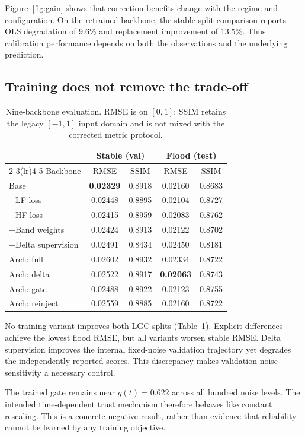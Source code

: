 \documentclass{article}
\begin{document}
Figure~\ref{fig:gain} shows that correction benefits change with the regime and configuration.
On the retrained backbone, the stable-split comparison reports OLS degradation of 9.6\% and replacement improvement of 13.5\%.
Thus calibration performance depends on both the observations and the underlying prediction.

\subsection{Training does not remove the trade-off}
\begin{table}[t]
\centering
\caption{Nine-backbone evaluation. RMSE is on $[0,1]$; SSIM retains the legacy $[-1,1]$ input domain and is not mixed with the corrected metric protocol.}
\label{tab:backbones}
\setlength{\tabcolsep}{2.5pt}
\begin{tabular}{lcccc}
\toprule
 & \multicolumn{2}{c}{Stable (val)} & \multicolumn{2}{c}{Flood (test)}\\
\cmidrule(lr){2-3}\cmidrule(lr){4-5}
Backbone & RMSE & SSIM & RMSE & SSIM\\
\midrule
Base & \textbf{0.02329} & 0.8918 & 0.02160 & 0.8683\\
+LF loss & 0.02448 & 0.8895 & 0.02104 & 0.8727\\
+HF loss & 0.02415 & 0.8959 & 0.02083 & 0.8762\\
+Band weights & 0.02424 & 0.8913 & 0.02122 & 0.8702\\
+Delta supervision & 0.02491 & 0.8434 & 0.02450 & 0.8181\\
Arch: full & 0.02602 & 0.8932 & 0.02334 & 0.8722\\
Arch: delta & 0.02522 & 0.8917 & \textbf{0.02063} & 0.8743\\
Arch: gate & 0.02488 & 0.8922 & 0.02123 & 0.8755\\
Arch: reinject & 0.02559 & 0.8885 & 0.02160 & 0.8722\\
\bottomrule
\end{tabular}
\end{table}

No training variant improves both LGC splits (Table~\ref{tab:backbones}).
Explicit differences achieve the lowest flood RMSE, but all variants worsen stable RMSE.
Delta supervision improves the internal fixed-noise validation trajectory yet degrades the independently reported scores.
This discrepancy makes validation-noise sensitivity a necessary control.

The trained gate remains near $g(t)=0.622$ across all hundred noise levels.
The intended time-dependent trust mechanism therefore behaves like constant rescaling.
This is a concrete negative result, rather than evidence that reliability cannot be learned by any training objective.
\end{document}
